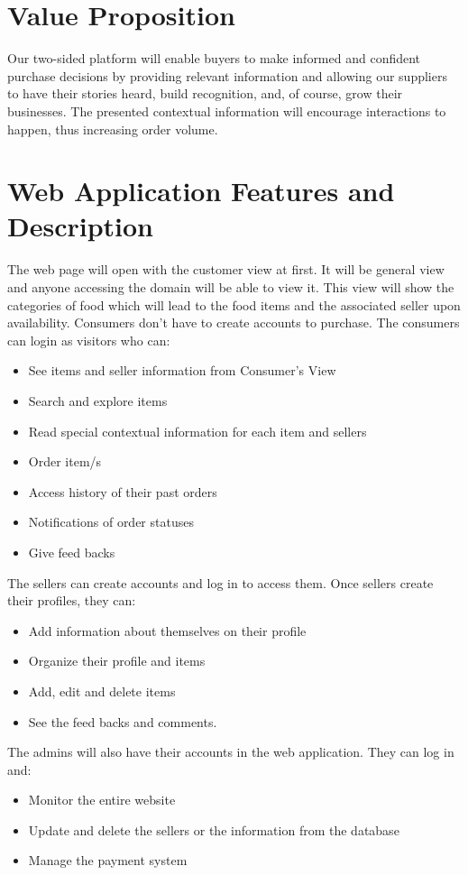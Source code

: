 \documentclass[12pt,a4paper]{article}
\begin{document}
\section*{Value Proposition} %
\label{sec:value_proposition}
Our two-sided platform will enable buyers to make informed and confident purchase decisions by providing relevant information and allowing our suppliers to have their stories heard, build recognition, and, of course, grow their businesses. The presented contextual information will encourage interactions to happen, thus increasing order volume.

\section*{Web Application Features and Description} %
\label{sec:web_application_features_and_description}
The web page will open with the customer view at first. It will be general view and anyone accessing the domain will be able to view it. This view will show the categories of food which will lead to the food items and the associated seller upon availability. Consumers don’t have to create accounts to purchase. The consumers can login as visitors who can:
\begin{itemize}
\item See items and seller information from Consumer’s View
\item Search and explore items
\item Read special contextual information for each item and sellers
\item Order item/s
\item Access history of their past orders
\item Notifications of order statuses
\item Give feed backs
\end{itemize}
The sellers can create accounts and log in to access them. Once sellers create their profiles, they can:
\begin{itemize}
\item Add information about themselves on their profile
\item Organize their profile and items
\item Add, edit and delete items
\item See the feed backs and comments. 
\end{itemize}
The admins will also have their accounts in the web application. They can log in and:
\begin{itemize}
\item  Monitor the entire website
\item Update and delete the sellers or the information from the database
\item Manage the payment system
\end{itemize}
\end{document}
